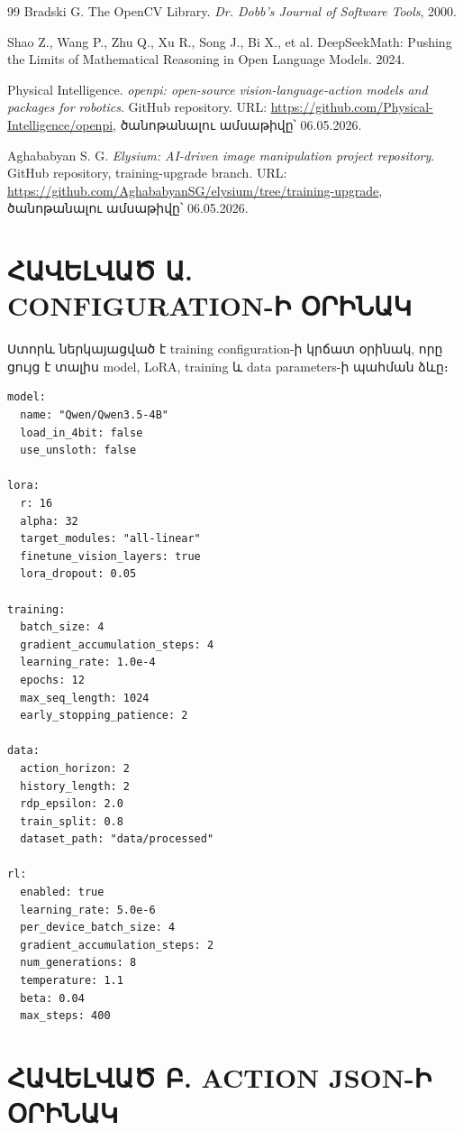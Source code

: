 \documentclass[12pt,a4paper]{report}
\begin{document}
\begin{thebibliography}{99}
Bradski G. The OpenCV Library. \textit{Dr. Dobb's Journal of Software Tools}, 2000.

Shao Z., Wang P., Zhu Q., Xu R., Song J., Bi X., et al. DeepSeekMath: Pushing the Limits of Mathematical Reasoning in Open Language Models. 2024.

Physical Intelligence. \textit{openpi: open-source vision-language-action models and packages for robotics}. GitHub repository. URL: \url{https://github.com/Physical-Intelligence/openpi}, ծանոթանալու ամսաթիվը՝ 06.05.2026.

Aghababyan S. G. \textit{Elysium: AI-driven image manipulation project repository}. GitHub repository, training-upgrade branch. URL: \url{https://github.com/AghababyanSG/elysium/tree/training-upgrade}, ծանոթանալու ամսաթիվը՝ 06.05.2026.

\end{thebibliography}

\appendix
\chapter*{ՀԱՎԵԼՎԱԾ Ա. CONFIGURATION-Ի ՕՐԻՆԱԿ}

Ստորև ներկայացված է training configuration-ի կրճատ օրինակ, որը ցույց է տալիս model, LoRA, training և data parameters-ի պահման ձևը։

\begin{lstlisting}[style=code]
model:
  name: "Qwen/Qwen3.5-4B"
  load_in_4bit: false
  use_unsloth: false

lora:
  r: 16
  alpha: 32
  target_modules: "all-linear"
  finetune_vision_layers: true
  lora_dropout: 0.05

training:
  batch_size: 4
  gradient_accumulation_steps: 4
  learning_rate: 1.0e-4
  epochs: 12
  max_seq_length: 1024
  early_stopping_patience: 2

data:
  action_horizon: 2
  history_length: 2
  rdp_epsilon: 2.0
  train_split: 0.8
  dataset_path: "data/processed"

rl:
  enabled: true
  learning_rate: 5.0e-6
  per_device_batch_size: 4
  gradient_accumulation_steps: 2
  num_generations: 8
  temperature: 1.1
  beta: 0.04
  max_steps: 400
\end{lstlisting}

\chapter*{ՀԱՎԵԼՎԱԾ Բ. ACTION JSON-Ի ՕՐԻՆԱԿ}
\end{document}
